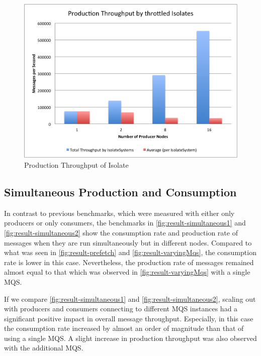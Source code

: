 \begin{figure}[H]
  \centering  \includegraphics[width=1\textwidth]{figures/06productionIsolate}
  \caption[Production Throughput of Isolate]{Production Throughput of Isolate}
  \label{fig:result-productionIsolate}
\end{figure}

\subsection{Simultaneous Production and Consumption}
\label{subsec:simultaneous}
  In contrast to previous benchmarks, which were measured with either only producers or only consumers, the benchmarks in \autoref{fig:result-simultaneous1} and \autoref{fig:result-simultaneous2} show the consumption rate and production rate of messages when they are run simultaneously but in different nodes. Compared to what was seen in \autoref{fig:result-prefetch} and
  \autoref{fig:result-varyingMqs}, the consumption rate is lower in this case. Nevertheless, the production rate of messages remained almost equal to that which was observed in \autoref{fig:result-varyingMqs} with a single MQS.

  If we compare \autoref{fig:result-simultaneous1} and \autoref{fig:result-simultaneous2}, scaling out with producers and consumers connecting to different MQS instances had a significant positive impact in overall message throughput. Especially, in this case the consumption rate increased by almost an order of magnitude than that of using a single MQS. A slight increase in production throughput was also observed with the additional MQS.

